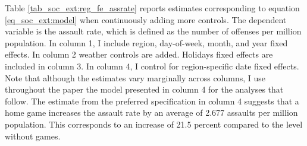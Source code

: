 

Table \ref{tab_soc_ext:reg_fe_assrate} reports estimates corresponding to equation \ref{eq_soc_ext:model} when continuously adding more controls. The dependent variable is the assault rate, which is defined as the number of offenses per million population. In column 1, I include region, day-of-week, month, and year fixed effects. In column 2 weather controls are added. Holidays fixed effects are included in column 3. In column 4, I control for region-specific date fixed effects. Note that although the estimates vary marginally across columns, I use throughout the paper the model presented in column 4 for the analyses that follow. The estimate from the preferred specification in column 4 suggests that a home game increases the assault rate by an average of 2.677 assaults per million population. This corresponds to an increase of 21.5 percent compared to the level without games.






